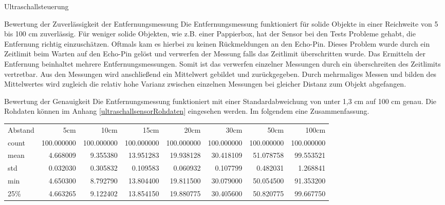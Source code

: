 \documentclass[12pt]{report}
\begin{document}
\begin{section}{Ultraschallsteuerung}
    \begin{subsection}{Bewertung der Zuverlässigkeit der Entfernungsmessung}
      Die Entfernungsmessung funktioniert für solide Objekte in einer Reichweite
      von 5 bis 100 cm zuverlässig. Für weniger solide Objekten, wie z.B. einer
      Pappierbox, hat der Sensor bei den Tests Probleme
      gehabt, die Entfernung richtig einzuschätzen. Oftmals kam es hierbei zu keinen Rückmeldungen an den Echo-Pin. Dieses
      Problem wurde durch ein Zeitlimit beim Warten auf den Echo-Pin gelöst und
      verwerfen der Messung falls das Zeitlimit überschritten wurde. Das
      Ermitteln der Entfernung beinhaltet mehrere Entfernungsmessungen. Somit
      ist das verwerfen einzelner Messungen durch ein überschreiten des
      Zeitlimits vertretbar. Aus den Messungen wird anschließend ein Mittelwert
      gebildet und zurückgegeben. Durch mehrmaliges Messen und bilden des
      Mittelwertes wird zugleich die relativ hohe Varianz zwischen einzelnen
      Messungen bei gleicher Distanz zum Objekt abgefangen.
    \end{subsection}
    \begin{subsection}{Bewertung der Genauigkeit}
      Die Entfernungsmessung funktioniert mit einer Standardabweichung von unter
      1,3 cm auf 100 cm genau.
      Die Rohdaten können im Anhang \ref{ultraschallsensorRohdaten} eingesehen werden.
      Im folgendem eine Zusammenfassung.
      \begin{table}[h!]
        \begin{tabular}{lrrrrrrr}
          Abstand &       5cm &        10cm &        15cm &        20cm &        30cm &        50cm &       100cm \\
          count &  100.000000 &  100.000000 &  100.000000 &  100.000000 &  100.000000 &  100.000000 &  100.000000 \\
          mean  &    4.668009 &    9.355380 &   13.951283 &   19.938128 &   30.418109 &   51.078758 &   99.553521 \\
          std   &    0.032030 &    0.305832 &    0.109583 &    0.060932 &    0.107799 &    0.482031 &    1.268841 \\
          min   &    4.650300 &    8.792790 &   13.804400 &   19.811500 &   30.079000 &   50.054500 &   91.353200 \\
          25\%   &    4.663265 &    9.122402 &   13.854150 &   19.880775 &   30.405600 &   50.820775 &   99.667750 \\

\end{tabular}
\end{table}
\end{subsection}
\end{section}
\end{document}
